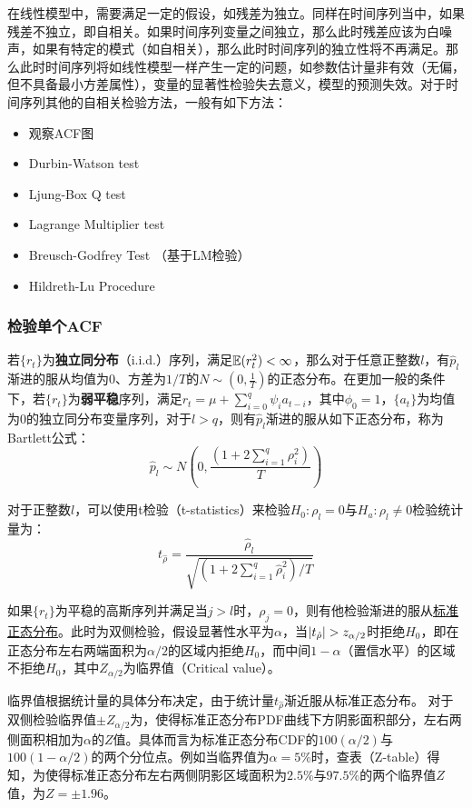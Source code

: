 \documentclass[11pt]{article}
\begin{document}
在线性模型中，需要满足一定的假设，如残差为独立。同样在时间序列当中，如果残差不独立，即自相关。如果时间序列变量之间独立，那么此时残差应该为白噪声，如果有特定的模式（如自相关），那么此时时间序列的独立性将不再满足。那么此时时间序列将如线性模型一样产生一定的问题，如参数估计量非有效（无偏，但不具备最小方差属性），变量的显著性检验失去意义，模型的预测失效。对于时间序列其他的自相关检验方法，一般有如下方法：
\begin{itemize}
    \item 观察ACF图
    \item Durbin-Watson test
    \item Ljung-Box Q test
    \item Lagrange Multiplier test
    \item Breusch-Godfrey Test （基于LM检验）
    \item Hildreth-Lu Procedure
\end{itemize}

\subsubsection{检验单个ACF}

若$\{r_t\}$为\textbf{独立同分布}（i.i.d.）序列，满足$\mathbb{E}(r_t^2)<\infty$，那么对于任意正整数$l$，有$\hat{p}_l$渐进的服从均值为$0$、方差为$1/T$的$N\sim(0,\frac{1}{T})$的正态分布。在更加一般的条件下，若$\{r_t\}$为\textbf{弱平稳}序列，满足$r_t = \mu + \sum_{i=0}^{q}\psi_i a_{t-i}$，其中$\phi_0=1$，$\{a_t\}$为均值为0的独立同分布变量序列，对于$l>q$，则有$\hat{p}_l$渐进的服从如下正态分布，称为Bartlett公式：
\begin{equation*}
    \hat{p}_l \sim N\left(0,\frac{\left( 1+2\sum_{i=1}^{q}\rho_i^2 \right)}{T} \right)    
\end{equation*}

对于正整数$l$，可以使用t检验（t-statistics）来检验$H_0: \rho_l =0$与$H_a: \rho_l \neq 0$检验统计量为：
\begin{equation*}
    t_{\hat{\rho}} = \frac{\hat{\rho}_l}{\sqrt{\left( 1+2\sum_{i=1}^{q}\hat{\rho}_i^2 \right)/T}}
\end{equation*}

如果$\{r_t\}$为平稳的高斯序列并满足当$j>l$时，$\rho_j=0$，则有他检验渐进的服从\uline{标准正态分布}。此时为双侧检验，假设显著性水平为$\alpha$，当$\left\lvert t_{\hat{\rho}}\right\rvert>z_{\alpha/2}$时拒绝$H_0$，即在正态分布左右两端面积为$\alpha/2$的区域内拒绝$H_0$，而中间$1-\alpha$（置信水平）的区域不拒绝$H_0$，其中$Z_{\alpha/2}$为临界值（Critical value）。

临界值根据统计量的具体分布决定，由于统计量$t_{\hat{\rho}}$渐近服从标准正态分布。
对于双侧检验临界值$\pm Z_{\alpha/2}$为，使得标准正态分布PDF曲线下方阴影面积部分，左右两侧面积相加为$\alpha$的$Z$值。具体而言为标准正态分布CDF的$100(\alpha/2)$与$100(1-\alpha/2)$的两个分位点。例如当临界值为$\alpha=5\%$时，查表（Z-table）得知，为使得标准正态分布左右两侧阴影区域面积为$2.5\%$与$97.5\%$的两个临界值$Z$值，为$Z=\pm 1.96$。
\end{document}
